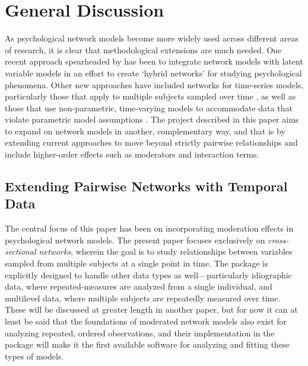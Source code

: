 \section{General Discussion}
As psychological network models become more widely used across different areas of research, it is clear that methodological extensions are much needed. One recent approach spearheaded by \cite{epskamp2017generalized} has been to integrate network models with latent variable models in an effort to create `hybrid networks' for studying psychological phenomena. Other new approaches have included networks for time-series models, particularly those that apply to multiple subjects sampled over time \cite{hamaker2018frontiers}, as well as those that use non-parametric, time-varying models to accommodate data that violate parametric model assumptions \cite{bringmann2017changing}. The project described in this paper aims to expand on network models in another, complementary way, and that is by extending current approaches to move beyond strictly pairwise relationships and include higher-order effects such as moderators and interaction terms.

\subsection{Extending Pairwise Networks with Temporal Data}
The central focus of this paper has been on incorporating moderation effects in psychological network models. The present paper focuses exclusively on \textit{cross-sectional networks}, wherein the goal is to study relationships between variables sampled from multiple subjects at a single point in time. The  package is explicitly designed to handle other data types as well---particularly idiographic data, where repeated-measures are analyzed from a single individual, and multilevel data, where multiple subjects are repeatedly measured over time. These will be discussed at greater length in another paper, but for now it can at least be said that the foundations of moderated network models also exist for analyzing repeated, ordered observations, and their implementation in the  package will make it the first available software for analyzing and fitting these types of models.
